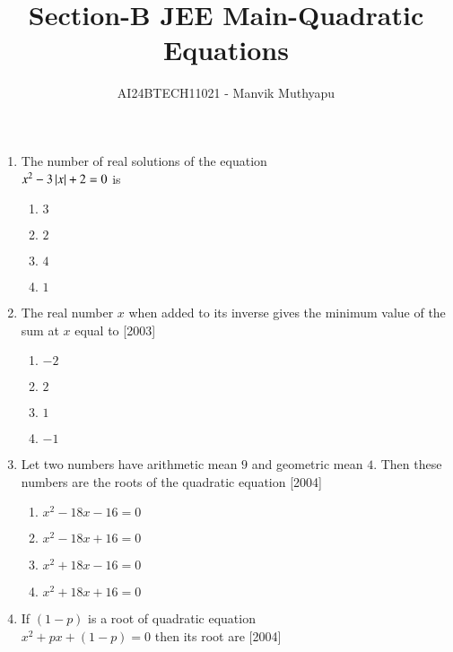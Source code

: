 \documentclass[journal,12pt,twocolumn]{IEEEtran}
\title{Section-B JEE Main-Quadratic Equations}
\author{AI24BTECH11021 - Manvik Muthyapu}
\theoremstyle{remark}
\begin{document}

\maketitle
\newpage
\bigskip

\renewcommand{\thefigure}{\theenumi}
\renewcommand{\thetable}{\theenumi}

\begin{enumerate}

\item The number of real solutions of the equation \\
	$ x^2 - 3\left\vert x\right\vert + 2 = 0$ is

\begin{enumerate}

	\item  $3$
	\item  $2$
	\item  $4$
	\item  $1$
    
\end{enumerate}

\item The real number $x$ when added to its inverse gives the minimum value of the sum at $x$ equal to
\hfill[2003]

\begin{enumerate}

	\item  $-2$
	\item  $2$
	\item  $1$
	\item  $-1$

\end{enumerate}

\item Let two numbers have arithmetic mean $9$ and geometric mean $4$. Then these numbers are the roots of the quadratic equation
\hfill[2004]

\begin{enumerate}

	\item  $x^2 - 18x - 16 = 0$
	\item  $x^2 - 18x + 16 = 0$
	\item  $x^2 + 18x - 16 = 0$
	\item  $x^2 + 18x + 16 = 0$

\end{enumerate}

\item If $(1 - p)$ is a root of quadratic equation\\
$x^2 + px + (1 - p) = 0$ then its root are
\hfill[2004]


\end{enumerate}
\end{document}
